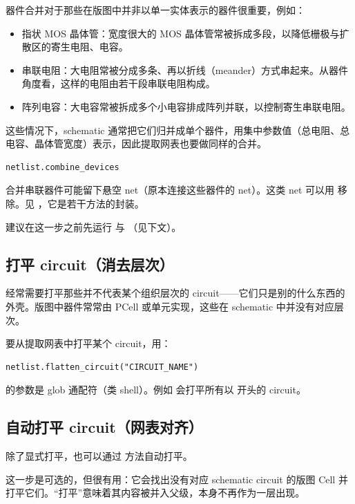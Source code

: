 器件合并对于那些在版图中并非以单一实体表示的器件很重要，例如：

\begin{itemize}
\item 指状 MOS 晶体管：宽度很大的 MOS 晶体管常被拆成多段，以降低栅极与扩散区的寄生电阻、电容。
\item 串联电阻：大电阻常被分成多条、再以折线（meander）方式串起来。从器件角度看，这样的电阻由若干段串联电阻构成。
\item 阵列电容：大电容常被拆成多个小电容排成阵列并联，以控制寄生串联电阻。
\end{itemize}

这些情况下，schematic 通常把它们归并成单个器件，用集中参数值（总电阻、总电容、晶体管宽度）表示，因此提取网表也要做同样的合并。

\begin{lstlisting}
netlist.combine_devices
\end{lstlisting}

合并串联器件可能留下悬空 net（原本连接这些器件的 net）。这类 net 可以用  移除。见 ，它是若干方法的封装。

建议在这一步之前先运行  与 （见下文）。

\subsection{打平 circuit（消去层次）}

经常需要打平那些并不代表某个组织层次的 circuit——它们只是别的什么东西的外壳。版图中器件常常由 PCell 或单元实现，这些在 schematic 中并没有对应层次。

要从提取网表中打平某个 circuit，用：

\begin{lstlisting}
netlist.flatten_circuit("CIRCUIT_NAME")
\end{lstlisting}

 的参数是 glob 通配符（类 shell）。例如  会打平所有以  开头的 circuit。

\subsection{自动打平 circuit（网表对齐）}

除了显式打平，也可以通过  方法自动打平。

这一步是可选的，但很有用：它会找出没有对应 schematic circuit 的版图 Cell 并打平它们。“打平”意味着其内容被并入父级，本身不再作为一层出现。

